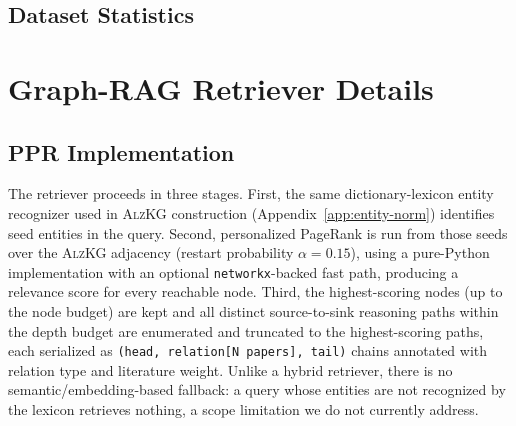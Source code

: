 \documentclass{article}
\begin{document}
\subsection{Dataset Statistics}
\label{app:dataset-stats}
\begin{table}[h]
\centering
\caption{\textsc{AlzBench} dataset statistics by task.}
\label{tab:bench-stats}
\small
{}
\end{table}

\newpage
\section{Graph-RAG Retriever Details}
\label{app:retriever-details}

\subsection{PPR Implementation}
\label{app:ppr-impl}
The retriever proceeds in three stages. First, the same dictionary-lexicon entity recognizer used in \textsc{AlzKG} construction (Appendix~\ref{app:entity-norm}) identifies seed entities in the query. Second, personalized PageRank is run from those seeds over the \textsc{AlzKG} adjacency (restart probability $\alpha{=}0.15$), using a pure-Python implementation with an optional \texttt{networkx}-backed fast path, producing a relevance score for every reachable node. Third, the highest-scoring nodes (up to the node budget) are kept and all distinct source-to-sink reasoning paths within the depth budget are enumerated and truncated to the highest-scoring paths, each serialized as \texttt{(head, relation[N papers], tail)} chains annotated with relation type and literature weight. Unlike a hybrid retriever, there is no semantic/embedding-based fallback: a query whose entities are not recognized by the lexicon retrieves nothing, a scope limitation we do not currently address.
\end{document}
